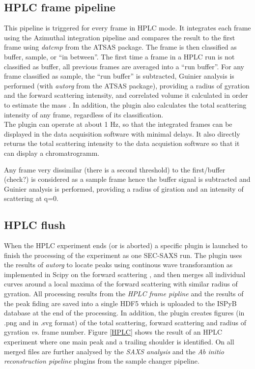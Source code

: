\documentclass[preprint,pdf]{iucr}              %
\begin{document}
\subsection{HPLC frame pipeline}

This pipeline is triggered for every frame in HPLC mode. It integrates each frame using the Azimuthal integration pipeline and compares the result to the first frame using \textit{datcmp} from the ATSAS package. The frame is then classified as buffer, sample, or ``in between''. The first time a frame in a HPLC run is not classified as buffer, all previous frames are averaged into a ``run buffer''.
For any frame classified as sample, the ``run buffer'' is subtracted, Guinier analysis is performed (with \textit{autorg} from the ATSAS package), providing a radius of gyration and the forward scattering intensity, and correlated volume it calculated in order to estimate the mass \cite{RamboTainerNature2013}. In addition, the plugin also calculates the total scattering intensity of any frame, regardless of its classification. \\
The plugin can operate at about 1 Hz, so that the integrated frames can be displayed in the data acquisition software with minimal delays. It also directly returns the total scattering intensity to the data acquistion software so that it can display a chromatrogramm.

Any frame very dissimilar (there is a second threshold) to the first/buffer
(check?) is considered as a sample frame hence the buffer signal is subtracted
and Guinier analysis is performed, providing a radius of giration and an
intensity of scattering at q=0.
 
\subsection{HPLC flush}
When the HPLC experiment ends (or is aborted) a specific plugin is launched to
finish the processing of the experiment as one SEC-SAXS run. The plugin uses the results of \textit{autorg} to locate peaks using continous wave transforamtion as implemented in Scipy on the forward scattering \cite{cwt,scipy}, and then merges all individual curves around a local maxima of the forward scattering with similar radius of gyration. All processing results from the \textit{HPLC frame pipline} and the results of the peak fiding are
saved into a single HDF5 which is uploaded to the ISPyB database at the end of the processing. In addition, the plugin creates figures (in .png and in .svg format) of the total scattering, forward scattering and radius of gyration \textit{vs.} frame number. Figure \ref{HPLC} shows the result of an HPLC
experiment where one main peak and a trailing shoulder is identified.
On all merged files are further analysed by the \textit{SAXS analysis} and the \textit{Ab initio reconstruction pipeline} plugins from the sample changer pipeline.
\end{document}
